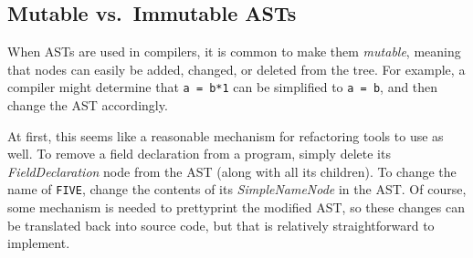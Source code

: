 \documentclass[prodmode]{acmlarge}
\newcommand{\ttt}[1]{\texttt{#1}}
\begin{document}
\subsection{Mutable vs.\ Immutable ASTs}
\label{ss:manip}

When ASTs are used in compilers, it is common to make them \textit{mutable},
meaning that nodes can easily be added, changed, or deleted from the tree.  For
example, a compiler might determine that \ttt{a~=~b*1} can be simplified to
\ttt{a~=~b}, and then change the AST accordingly.

At first, this seems like a reasonable mechanism for refactoring tools to use
as well.  To remove a field declaration from a program, simply delete its
\textit{FieldDeclaration} node from the AST (along with all its children).  To
change the name of \ttt{FIVE}, change the contents of its
\textit{SimpleNameNode} in the AST.  Of course, some mechanism is needed to
prettyprint the modified AST, so these changes can be translated back into
source code, but that is relatively straightforward to implement.
\end{document}
